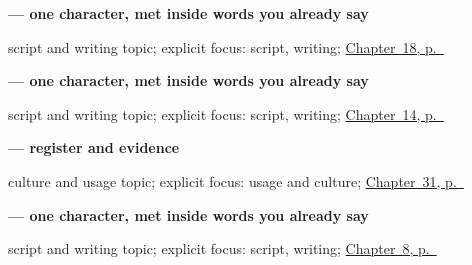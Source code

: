 \noindent\begin{minipage}[t]{\linewidth}
\raggedright
\textbf{ — one character, met inside words you already say}\par
\footnotesize script and writing topic; explicit focus: script, writing; \hyperref[ch:te-telling-time]{Chapter~18, p.~\pageref*{ch:te-telling-time}}
\end{minipage}\par\smallskip

\noindent\begin{minipage}[t]{\linewidth}
\raggedright
\textbf{ — one character, met inside words you already say}\par
\footnotesize script and writing topic; explicit focus: script, writing; \hyperref[ch:te-seasons]{Chapter~14, p.~\pageref*{ch:te-seasons}}
\end{minipage}\par\smallskip

\noindent\begin{minipage}[t]{\linewidth}
\raggedright
\textbf{  — register and evidence}\par
\footnotesize culture and usage topic; explicit focus: usage and culture; \hyperref[ch:te-good-afternoon]{Chapter~31, p.~\pageref*{ch:te-good-afternoon}}
\end{minipage}\par\smallskip

\noindent\begin{minipage}[t]{\linewidth}
\raggedright
\textbf{ — one character, met inside words you already say}\par
\footnotesize script and writing topic; explicit focus: script, writing; \hyperref[ch:te-please]{Chapter~8, p.~\pageref*{ch:te-please}}
\end{minipage}\par\smallskip
